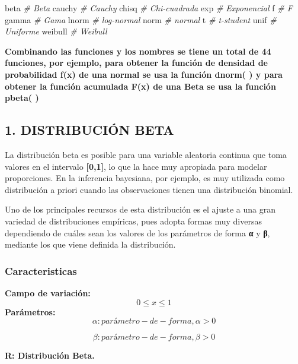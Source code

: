 \documentclass[
]{article}
\newenvironment{Shaded}{\begin{snugshade}}{\end{snugshade}}
\newcommand{\CommentTok}[1]{\textcolor[rgb]{0.56,0.35,0.01}{\textit{#1}}}
\newcommand{\NormalTok}[1]{#1}
\begin{document}
\begin{Shaded}
\begin{Highlighting}[]
\NormalTok{beta     }\CommentTok{\# Beta}
\NormalTok{cauchy   }\CommentTok{\# Cauchy}
\NormalTok{chisq    }\CommentTok{\# Chi{-}cuadrada}
\NormalTok{exp      }\CommentTok{\# Exponencial}
\NormalTok{f        }\CommentTok{\# F}
\NormalTok{gamma    }\CommentTok{\# Gama}
\NormalTok{lnorm    }\CommentTok{\# log{-}normal}
\NormalTok{norm     }\CommentTok{\# normal}
\NormalTok{t        }\CommentTok{\# t{-}student}
\NormalTok{unif     }\CommentTok{\# Uniforme}
\NormalTok{weibull  }\CommentTok{\# Weibull}
\end{Highlighting}
\end{Shaded}

\textbf{Combinando las funciones y los nombres se tiene un total de 44
funciones, por ejemplo, para obtener la función de densidad de
probabilidad f(x) de una normal se usa la función dnorm( ) y para
obtener la función acumulada F(x) de una Beta se usa la función pbeta(
)}

\hypertarget{distribuciuxf3n-beta}{%
\subsection{1. DISTRIBUCIÓN BETA}\label{distribuciuxf3n-beta}}

La distribución beta es posible para una variable aleatoria continua que
toma valores en el intervalo \textbf{{[}0,1{]}}, lo que la hace muy
apropiada para modelar proporciones. En la inferencia bayesiana, por
ejemplo, es muy utilizada como distribución a priori cuando las
observaciones tienen una distribución binomial.

Uno de los principales recursos de esta distribución es el ajuste a una
gran variedad de distribuciones empíricas, pues adopta formas muy
diversas dependiendo de cuáles sean los valores de los parámetros de
forma \textbf{α} y \textbf{β}, mediante los que viene definida la
distribución.

\hypertarget{caracteristicas}{%
\subsubsection{Caracteristicas}\label{caracteristicas}}

\textbf{Campo de variación:} \[0≤x≤1\] \textbf{Parámetros:}
\[α: parámetro -de -forma,α>0\]

\[β:parámetro -de -forma,β>0\]

\textbf{R: Distribución Beta.}
\end{document}
